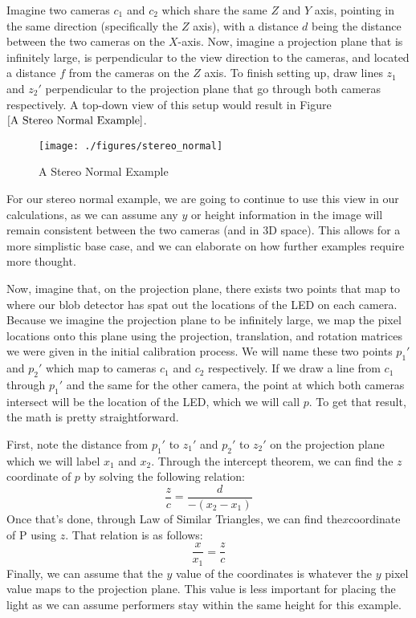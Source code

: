 \documentclass[
    12pt,
    twoside,
    bibstyle=chicago,
    headerstyle=uppercase,
	bibfile=biblatex_updating.bib
]{reedthesis}
\begin{document}
Imagine two cameras $c_1$ and $c_2$ which share the same $Z$ and $Y$ axis, pointing in the same direction (specifically the $Z$ axis), with a distance $d$ being the distance between the two cameras on the $X$-axis. Now, imagine a projection plane that is infinitely large, is perpendicular to the view direction to the cameras, and located a distance $f$ from the cameras on the $Z$ axis. To finish setting up, draw lines $z_1$ and $z_2'$ perpendicular to the projection plane that go through both cameras respectively. A top-down view of this setup would result in Figure $\ref{A Stereo Normal Example}$.
	
	\begin{figure}[h]
	   
	       \centering
	        
	    \texttt{[image: ./figures/stereo\_normal]}
	     \caption{A Stereo Normal Example}
	 \label{A Stereo Normal Example}
	\end{figure}

For our stereo normal example, we are going to continue to use this view in our calculations, as we can assume any $y$ or height information in the image will remain consistent between the two cameras (and in 3D space). This allows for a more simplistic base case, and we can elaborate on how further examples require more thought.

Now, imagine that, on the projection plane, there exists two points that map to where our blob detector has spat out the locations of the LED on each camera. Because we imagine the projection plane to be infinitely large, we map the pixel locations onto this plane using the projection, translation, and rotation matrices we were given in the initial calibration process. We will name these two points $p_1'$ and $p_2'$ which map to cameras $c_1$ and $c_2$ respectively. If we draw a line from $c_1$ through $p_1'$ and the same for the other camera, the point at which both cameras intersect will be the location of the LED, which we will call $p$. To get that result, the math is pretty straightforward.

First, note the distance from $p_1'$ to $z_1'$ and $p_2'$ to $z_2'$ on the projection plane which we will label $x_1$ and $x_2$. Through the intercept theorem, we can find the $z$ coordinate of $p$ by solving the following relation:
\[\frac{z}{c} = \frac{d}{-(x_2 - x_1)}\]
Once that's done, through Law of Similar Triangles, we can find the$x$coordinate of P using $z$. That relation is as follows:
\[\frac{x}{x_1}=\frac{z}{c}\]
Finally, we can assume that the $y$ value of the coordinates is whatever the $y$ pixel value maps to the projection plane. This value is less important for placing the light as we can assume performers stay within the same height for this example.
\end{document}

